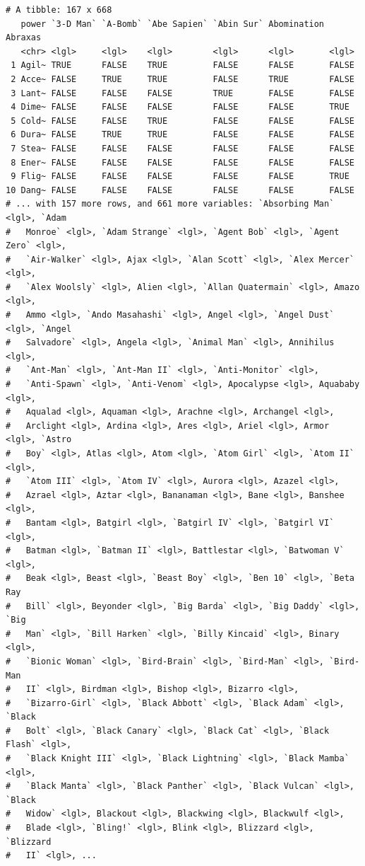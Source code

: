 \documentclass[
]{book}
\begin{document}
\begin{verbatim}
# A tibble: 167 x 668
   power `3-D Man` `A-Bomb` `Abe Sapien` `Abin Sur` Abomination Abraxas
   <chr> <lgl>     <lgl>    <lgl>        <lgl>      <lgl>       <lgl>  
 1 Agil~ TRUE      FALSE    TRUE         FALSE      FALSE       FALSE  
 2 Acce~ FALSE     TRUE     TRUE         FALSE      TRUE        FALSE  
 3 Lant~ FALSE     FALSE    FALSE        TRUE       FALSE       FALSE  
 4 Dime~ FALSE     FALSE    FALSE        FALSE      FALSE       TRUE   
 5 Cold~ FALSE     FALSE    TRUE         FALSE      FALSE       FALSE  
 6 Dura~ FALSE     TRUE     TRUE         FALSE      FALSE       FALSE  
 7 Stea~ FALSE     FALSE    FALSE        FALSE      FALSE       FALSE  
 8 Ener~ FALSE     FALSE    FALSE        FALSE      FALSE       FALSE  
 9 Flig~ FALSE     FALSE    FALSE        FALSE      FALSE       TRUE   
10 Dang~ FALSE     FALSE    FALSE        FALSE      FALSE       FALSE  
# ... with 157 more rows, and 661 more variables: `Absorbing Man` <lgl>, `Adam
#   Monroe` <lgl>, `Adam Strange` <lgl>, `Agent Bob` <lgl>, `Agent Zero` <lgl>,
#   `Air-Walker` <lgl>, Ajax <lgl>, `Alan Scott` <lgl>, `Alex Mercer` <lgl>,
#   `Alex Woolsly` <lgl>, Alien <lgl>, `Allan Quatermain` <lgl>, Amazo <lgl>,
#   Ammo <lgl>, `Ando Masahashi` <lgl>, Angel <lgl>, `Angel Dust` <lgl>, `Angel
#   Salvadore` <lgl>, Angela <lgl>, `Animal Man` <lgl>, Annihilus <lgl>,
#   `Ant-Man` <lgl>, `Ant-Man II` <lgl>, `Anti-Monitor` <lgl>,
#   `Anti-Spawn` <lgl>, `Anti-Venom` <lgl>, Apocalypse <lgl>, Aquababy <lgl>,
#   Aqualad <lgl>, Aquaman <lgl>, Arachne <lgl>, Archangel <lgl>,
#   Arclight <lgl>, Ardina <lgl>, Ares <lgl>, Ariel <lgl>, Armor <lgl>, `Astro
#   Boy` <lgl>, Atlas <lgl>, Atom <lgl>, `Atom Girl` <lgl>, `Atom II` <lgl>,
#   `Atom III` <lgl>, `Atom IV` <lgl>, Aurora <lgl>, Azazel <lgl>,
#   Azrael <lgl>, Aztar <lgl>, Bananaman <lgl>, Bane <lgl>, Banshee <lgl>,
#   Bantam <lgl>, Batgirl <lgl>, `Batgirl IV` <lgl>, `Batgirl VI` <lgl>,
#   Batman <lgl>, `Batman II` <lgl>, Battlestar <lgl>, `Batwoman V` <lgl>,
#   Beak <lgl>, Beast <lgl>, `Beast Boy` <lgl>, `Ben 10` <lgl>, `Beta Ray
#   Bill` <lgl>, Beyonder <lgl>, `Big Barda` <lgl>, `Big Daddy` <lgl>, `Big
#   Man` <lgl>, `Bill Harken` <lgl>, `Billy Kincaid` <lgl>, Binary <lgl>,
#   `Bionic Woman` <lgl>, `Bird-Brain` <lgl>, `Bird-Man` <lgl>, `Bird-Man
#   II` <lgl>, Birdman <lgl>, Bishop <lgl>, Bizarro <lgl>,
#   `Bizarro-Girl` <lgl>, `Black Abbott` <lgl>, `Black Adam` <lgl>, `Black
#   Bolt` <lgl>, `Black Canary` <lgl>, `Black Cat` <lgl>, `Black Flash` <lgl>,
#   `Black Knight III` <lgl>, `Black Lightning` <lgl>, `Black Mamba` <lgl>,
#   `Black Manta` <lgl>, `Black Panther` <lgl>, `Black Vulcan` <lgl>, `Black
#   Widow` <lgl>, Blackout <lgl>, Blackwing <lgl>, Blackwulf <lgl>,
#   Blade <lgl>, `Bling!` <lgl>, Blink <lgl>, Blizzard <lgl>, `Blizzard
#   II` <lgl>, ...
\end{verbatim}

  
\end{document}
